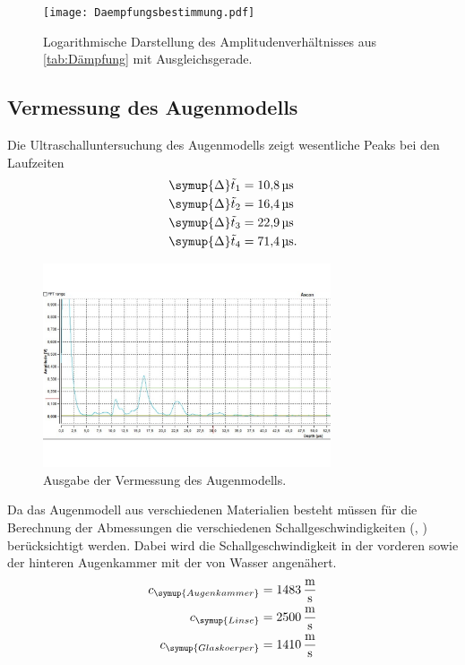 \begin{figure}[H]
  \centering
  \texttt{[image: Daempfungsbestimmung.pdf]}
  \caption{Logarithmische Darstellung des Amplitudenverhältnisses aus \autoref{tab:Dämpfung} mit Ausgleichsgerade.}
  \label{fig:Dämpfung}
\end{figure}

\subsection{Vermessung des Augenmodells}
Die Ultraschalluntersuchung des Augenmodells zeigt wesentliche Peaks bei den Laufzeiten
\begin{align*}
  \symup{\Delta}\tilde{t}_1 &= \qty{10,8}{\micro\second} \\
  \symup{\Delta}\tilde{t}_2 &= \qty{16,4}{\micro\second} \\
  \symup{\Delta}\tilde{t}_3 &= \qty{22,9}{\micro\second} \\
  \symup{\Delta}\tilde{t}_4 &= \qty{71,4}{\micro\second}. \\
\end{align*}
\begin{figure}[H]
  \centering
  \includegraphics[height=6cm]{content/Abbildungen/Auge.pdf}
  \caption{Ausgabe der Vermessung des Augenmodells.}
  \label{fig:Messung Auge}
\end{figure}
Da das Augenmodell aus verschiedenen Materialien besteht müssen für die Berechnung der Abmessungen die verschiedenen 
Schallgeschwindigkeiten (\cite{czichos}, \cite{US1}) berücksichtigt werden. Dabei wird die Schallgeschwindigkeit in der vorderen sowie der
hinteren Augenkammer mit der von Wasser angenähert.
\begin{align*}
  c_{\symup{Augenkammer}} &= \qty{1483} {\metre\per\second} \\
  c_{\symup{Linse}} &= \qty{2500}{\metre\per\second} \\
  c_{\symup{Glaskoerper}} &= \qty{1410}{\metre\per\second} \\
\end{align*}
